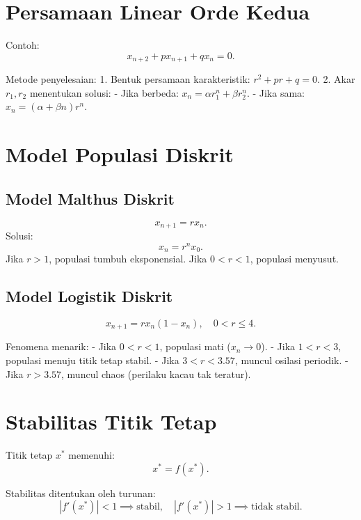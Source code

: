 \documentclass{bukumjh}
\begin{document}
\section{Persamaan Linear Orde Kedua}
Contoh:
\[
x_{n+2} + p x_{n+1} + q x_n = 0.
\]

Metode penyelesaian:
1. Bentuk persamaan karakteristik: $r^2 + pr + q = 0$.  
2. Akar $r_1, r_2$ menentukan solusi:
   - Jika berbeda: $x_n = \alpha r_1^n + \beta r_2^n$.  
   - Jika sama: $x_n = (\alpha + \beta n) r^n$.  

\section{Model Populasi Diskrit}
\subsection{Model Malthus Diskrit}
\[
x_{n+1} = rx_n.
\]
Solusi:
\[
x_n = r^n x_0.
\]
Jika $r>1$, populasi tumbuh eksponensial. Jika $0<r<1$, populasi menyusut.

\subsection{Model Logistik Diskrit}
\[
x_{n+1} = rx_n(1-x_n), \quad 0 < r \leq 4.
\]

{\jsg Fenomena menarik:}
- Jika $0<r<1$, populasi mati ($x_n \to 0$).
- Jika $1<r<3$, populasi menuju titik tetap stabil.
- Jika $3<r<3.57$, muncul osilasi periodik.
- Jika $r>3.57$, muncul {\jsg chaos} (perilaku kacau tak teratur).

\section{Stabilitas Titik Tetap}
Titik tetap $x^\ast$ memenuhi:
\[
x^\ast = f(x^\ast).
\]

Stabilitas ditentukan oleh turunan:
\[
|f'(x^\ast)| < 1 \implies \text{stabil}, \quad |f'(x^\ast)| > 1 \implies \text{tidak stabil}.
\]
\end{document}
